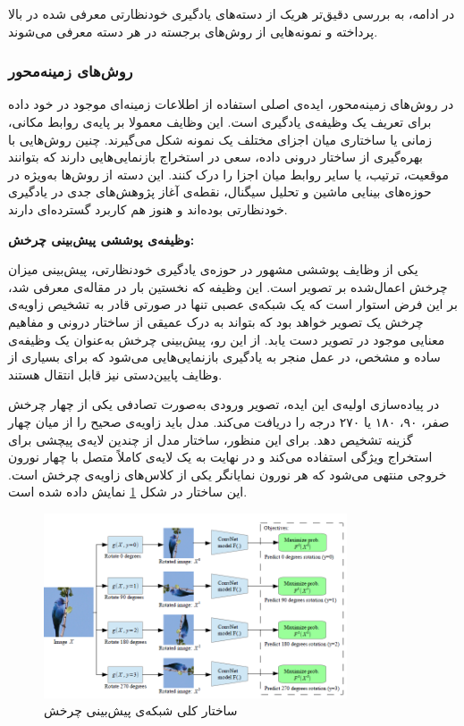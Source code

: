 در ادامه، به بررسی دقیق‌تر هریک از دسته‌های یادگیری خودنظارتی معرفی شده در بالا پرداخته و نمونه‌هایی از روش‌های برجسته در هر دسته معرفی می‌شوند.

\subsubsection{روش‌های زمینه‌محور}

در روش‌های زمینه‌محور، ایده‌ی اصلی استفاده از اطلاعات زمینه‌ای موجود در خود داده برای تعریف یک وظیفه‌ی یادگیری است. این وظایف معمولا بر پایه‌ی روابط مکانی، زمانی یا ساختاری میان اجزای مختلف یک نمونه شکل می‌گیرند. چنین روش‌هایی با بهره‌گیری از ساختار درونی داده، سعی در استخراج بازنمایی‌هایی دارند که بتوانند موقعیت، ترتیب، یا سایر روابط میان اجزا را درک کنند. این دسته از روش‌ها به‌ویژه در حوزه‌های بینایی ماشین و تحلیل سیگنال، نقطه‌ی آغاز پژوهش‌های جدی در یادگیری خودنظارتی بوده‌اند و هنوز هم کاربرد گسترده‌ای دارند.\newline\newline

\noindent\textbf{وظیفه‌ی پوششی پیش‌بینی چرخش:}

یکی از وظایف پوششی مشهور در حوزه‌ی یادگیری خودنظارتی، پیش‌بینی میزان چرخش اعمال‌شده بر تصویر است. این وظیفه که نخستین بار در مقاله‌ی  \cite{gidaris2018unsupervised} معرفی شد، بر این فرض استوار است که یک شبکه‌ی عصبی تنها در صورتی قادر به تشخیص زاویه‌ی چرخش یک تصویر خواهد بود که بتواند به درک عمیقی از ساختار درونی و مفاهیم معنایی موجود در تصویر دست یابد. از این رو، پیش‌بینی چرخش به‌عنوان یک وظیفه‌ی ساده و مشخص، در عمل منجر به یادگیری بازنمایی‌هایی می‌شود که برای بسیاری از وظایف پایین‌دستی نیز قابل انتقال هستند.

در پیاده‌سازی اولیه‌ی این ایده، تصویر ورودی به‌صورت تصادفی یکی از چهار چرخش صفر، ۹۰، ۱۸۰ یا ۲۷۰ درجه را دریافت می‌کند. مدل باید زاویه‌ی صحیح را از میان چهار گزینه تشخیص دهد. برای این منظور، ساختار مدل از چندین لایه‌ی پیچشی  برای استخراج ویژگی استفاده می‌کند و در نهایت به یک لایه‌ی کاملاً متصل با چهار نورون خروجی منتهی می‌شود که هر نورون نمایانگر یکی از کلاس‌های زاویه‌ی چرخش است. این ساختار در شکل \ref{fig:rotnet} نمایش داده شده است.

\begin{figure}[htbp]
\centering
\includegraphics[width=0.8\textwidth]{Images/Chapter2/rotnet.png}
\caption{ساختار کلی شبکه‌ی پیش‌بینی چرخش}
\label{fig:rotnet}
\end{figure}

